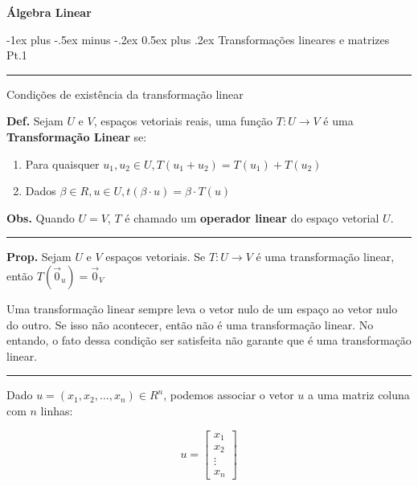 \documentclass[10pt,landscape]{article}
\makeatletter
\renewcommand{\section}{\@startsection{section}{1}{0mm}%
                                {-1ex plus -.5ex minus -.2ex}%
                                {0.5ex plus .2ex}%
                                {\normalfont\large\bfseries}}
\makeatother
\begin{document}
\raggedright
\footnotesize
\begin{multicols}{3}


\setlength{\premulticols}{1pt}
\setlength{\postmulticols}{1pt}
\setlength{\multicolsep}{1pt}
\setlength{\columnsep}{2pt}

\begin{center}
     \Large{\textbf{Álgebra Linear}} \\
\end{center}

\section{Transformações lineares e matrizes Pt.1}

\hrule
\medskip

Condições de existência da transformação linear

\textbf{Def.} Sejam $U$ e $V$, espaços vetoriais reais, uma função $T:U\rightarrow V$ é uma \textbf{Transformação Linear} se:

\begin{enumerate}[label=(\roman*),wide=0pt]

\item Para quaisquer $u_1, u_2 \in U, T(u_1 + u_2) = T(u_1) + T(u_2)$
\item Dados $\beta \in R, u \in U, t(\beta\cdot u)=\beta\cdot T(u)$

\end{enumerate}

\textbf{Obs.} Quando $U=V$, $T$ é chamado um \textbf{operador linear} do espaço vetorial $U$.

\medskip 
\hrule
\medskip

\textbf{Prop.} Sejam $U$ e $V$ espaços vetoriais. Se $T:U\rightarrow V$ é uma transformação linear, então $T(\vec{0}_u)=\vec{0}_V$

Uma transformação linear sempre leva o vetor nulo de um espaço ao vetor nulo do outro. Se isso não acontecer, então não é uma transformação linear. No entando, o fato dessa condição ser satisfeita não garante que é uma transformação linear.

\medskip
\hrule
\medskip

Dado $u=(x_1,x_2,\ldots,x_n) \in R^n$, podemos associar o vetor $u$ a uma matriz coluna com $n$ linhas:

$$
u=
\begin{bmatrix}
x_1\\
x_2\\
\vdots\\
x_n
\end{bmatrix}
$$


\end{multicols}
\end{document}
